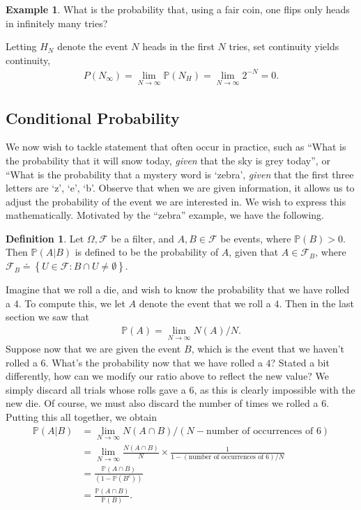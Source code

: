 \documentclass[12pt]{article}
\newcommand{\filter}{\mathcal{F}}
\newcommand{\prob}{\mathbb{P}}
\theoremstyle{plain}
\theoremstyle{definition}
\newtheorem*{definition}{Definition}
\newtheorem*{example}{Example}
\theoremstyle{remark}
\numberwithin{equation}{section}  %
\begin{document}
\begin{example}What is the probability that, using a fair coin, one
flips only heads in infinitely many tries? 
\end{example}
Letting $H_N$ denote the event
$N$ heads in the first $N$ tries, set continuity yields
continuity,
\begin{align*}
P(N_\infty) = \lim_{N \to \infty} \prob(N_H) = \lim_{N \to \infty} 2^{-N} = 0.
\end{align*}
\subsection{Conditional Probability}
We now wish to tackle statement that often occur in practice,
such as ``What is the probability that it will snow today, \emph{given}
that the sky is grey today'', or ``What is the probability that a mystery word
is `zebra', \emph{given} that the first three letters are
`z', `e', `b'.
Observe that when we are given information, it allows us to adjust the
probability of the event we are interested in. We wish to express this
mathematically. Motivated by the ``zebra'' example, we have the following.
\begin{definition}
Let $\Omega, \filter$ be a filter, and $A, B \in \filter$ be events, where
$\prob(B) > 0$. Then $\prob(A | B)$ is defined to be the probability of $A$, given that $A \in \filter_B$, where $\filter_B
\doteq \left\{ U \in \filter: B \cap U \neq \emptyset \right\}$.
\end{definition}
Imagine that we roll a die, and wish to know the probability that
we have rolled a $4$.
To compute this, we let $A$ denote the event that we roll a $4$. Then in the last section we saw
that
\begin{align*}
\prob(A) = \lim_{N \to \infty} N(A)/N.
\end{align*}
Suppose now that we are given the event $B$, which is the event that we haven't
rolled a $6$.
What's the probability now that we have rolled a $4$?
Stated a bit differently, how can we modify our ratio above to reflect the
new value? We simply discard all trials whose rolls gave a $6$, as this is clearly
impossible with the new die. Of course, we must also discard the number of times
we rolled a $6$. Putting this all together, we obtain
\begin{align*}
\prob(A | B) & = \lim_{N \to \infty} N(A \cap B)/(N -
\text{number of occurrences of $6$})
\\
& = \lim_{N \to \infty} \frac{N(A \cap B)}{N}
\times \frac{1}{1 - (\text{number of occurrences of $6$})/N}
\\
& = \frac{\prob(A \cap B)}{(1 - \prob(B^c))}
\\
& = \frac{\prob(A \cap B)}{\prob(B)}.
\end{align*}
\end{document}
